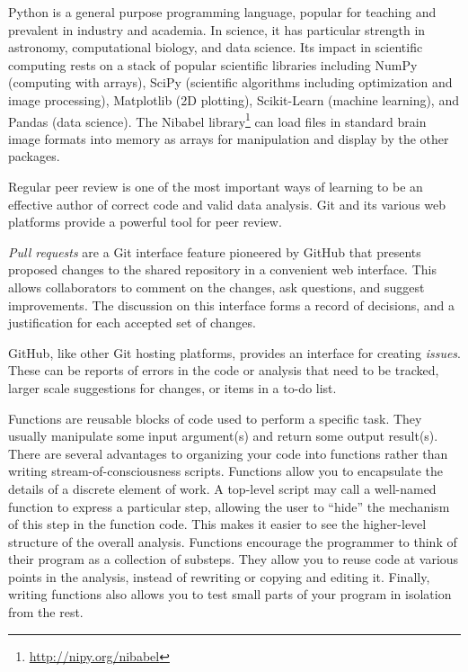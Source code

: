 Python is a general purpose programming language,
popular for teaching and prevalent in industry and academia.
In science, it has particular strength in
astronomy, computational biology, and data science.
Its impact in scientific computing rests on a stack of popular scientific
libraries including NumPy (computing with arrays), SciPy (scientific
algorithms including optimization and image processing), Matplotlib (2D
plotting), Scikit-Learn (machine learning), and Pandas (data science).  The
Nibabel library\footnote{\url{http://nipy.org/nibabel}\label{nibabel}} can load
files in standard brain image formats into memory as arrays for manipulation
and display by the other packages.

Regular peer review is one of the most important ways of learning
to be an effective author of correct code and valid data analysis.  Git and its
various web platforms provide a powerful tool for peer review.

\emph{Pull requests} are a Git interface feature pioneered by GitHub that
presents proposed changes to the shared repository in a convenient web
interface. This allows collaborators to comment on the changes, ask questions,
and suggest improvements.  The discussion on this interface forms a record of
decisions, and a justification for each accepted set of changes.

GitHub, like other Git hosting platforms, provides an interface for creating
\emph{issues}.  These can be reports of errors in the code or analysis that need
to be tracked, larger scale suggestions for changes, or items in a to-do list.

Functions are reusable blocks of code used to perform a specific task.
They usually manipulate some input argument(s) and return some output
result(s).
There are several advantages to organizing your code into functions rather
than writing stream-of-consciousness scripts.
Functions allow you to encapsulate the details of a discrete element of
work.  A top-level script may call a well-named function to express a
particular step, allowing the user to ``hide'' the mechanism of this step in
the function code.  This makes it easier to see the higher-level structure of
the overall analysis.
Functions encourage the programmer to think of their program as a collection
of substeps.
They allow you to reuse code at various points in the analysis, instead of
rewriting or copying and editing it.
Finally, writing functions also allows you to test small parts of your program
in isolation from the rest.

